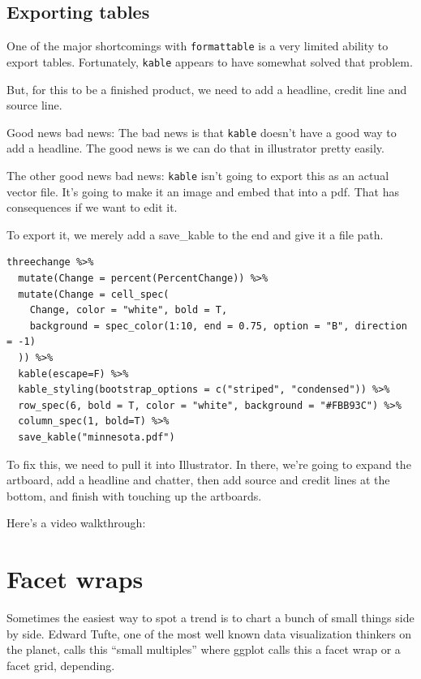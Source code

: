 \documentclass[
]{book}
\begin{document}
\hypertarget{exporting-tables}{%
\section{Exporting tables}\label{exporting-tables}}

One of the major shortcomings with \texttt{formattable} is a very limited ability to export tables. Fortunately, \texttt{kable} appears to have somewhat solved that problem.

But, for this to be a finished product, we need to add a headline, credit line and source line.

Good news bad news: The bad news is that \texttt{kable} doesn't have a good way to add a headline. The good news is we can do that in illustrator pretty easily.

The other good news bad news: \texttt{kable} isn't going to export this as an actual vector file. It's going to make it an image and embed that into a pdf. That has consequences if we want to edit it.

To export it, we merely add a save\_kable to the end and give it a file path.

\begin{verbatim}
threechange %>% 
  mutate(Change = percent(PercentChange)) %>%
  mutate(Change = cell_spec(
    Change, color = "white", bold = T,
    background = spec_color(1:10, end = 0.75, option = "B", direction = -1)
  )) %>%
  kable(escape=F) %>% 
  kable_styling(bootstrap_options = c("striped", "condensed")) %>%
  row_spec(6, bold = T, color = "white", background = "#FBB93C") %>%
  column_spec(1, bold=T) %>%
  save_kable("minnesota.pdf")
\end{verbatim}

To fix this, we need to pull it into Illustrator. In there, we're going to expand the artboard, add a headline and chatter, then add source and credit lines at the bottom, and finish with touching up the artboards.

Here's a video walkthrough:

\hypertarget{facet-wraps}{%
\chapter{Facet wraps}\label{facet-wraps}}

Sometimes the easiest way to spot a trend is to chart a bunch of small things side by side. Edward Tufte, one of the most well known data visualization thinkers on the planet, calls this ``small multiples'' where ggplot calls this a facet wrap or a facet grid, depending.
\end{document}

